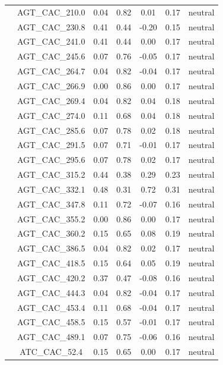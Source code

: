 \documentclass[11pt,]{article}
\begin{document}
\begin{longtable}[c]{@{}lcccccc@{}}
& AGT\_CAC\_210.0 & 0.04 & 0.82 & 0.01 & 0.17 & neutral
\\\addlinespace
& AGT\_CAC\_230.8 & 0.41 & 0.44 & -0.20 & 0.15 & neutral
\\\addlinespace
& AGT\_CAC\_241.0 & 0.41 & 0.44 & 0.00 & 0.17 & neutral
\\\addlinespace
& AGT\_CAC\_245.6 & 0.07 & 0.76 & -0.05 & 0.17 & neutral
\\\addlinespace
& AGT\_CAC\_264.7 & 0.04 & 0.82 & -0.04 & 0.17 & neutral
\\\addlinespace
& AGT\_CAC\_266.9 & 0.00 & 0.86 & 0.00 & 0.17 & neutral
\\\addlinespace
& AGT\_CAC\_269.4 & 0.04 & 0.82 & 0.04 & 0.18 & neutral
\\\addlinespace
& AGT\_CAC\_274.0 & 0.11 & 0.68 & 0.04 & 0.18 & neutral
\\\addlinespace
& AGT\_CAC\_285.6 & 0.07 & 0.78 & 0.02 & 0.18 & neutral
\\\addlinespace
& AGT\_CAC\_291.5 & 0.07 & 0.71 & -0.01 & 0.17 & neutral
\\\addlinespace
& AGT\_CAC\_295.6 & 0.07 & 0.78 & 0.02 & 0.17 & neutral
\\\addlinespace
& AGT\_CAC\_315.2 & 0.44 & 0.38 & 0.29 & 0.23 & neutral
\\\addlinespace
& AGT\_CAC\_332.1 & 0.48 & 0.31 & 0.72 & 0.31 & neutral
\\\addlinespace
& AGT\_CAC\_347.8 & 0.11 & 0.72 & -0.07 & 0.16 & neutral
\\\addlinespace
& AGT\_CAC\_355.2 & 0.00 & 0.86 & 0.00 & 0.17 & neutral
\\\addlinespace
& AGT\_CAC\_360.2 & 0.15 & 0.65 & 0.08 & 0.19 & neutral
\\\addlinespace
& AGT\_CAC\_386.5 & 0.04 & 0.82 & 0.02 & 0.17 & neutral
\\\addlinespace
& AGT\_CAC\_418.5 & 0.15 & 0.64 & 0.05 & 0.19 & neutral
\\\addlinespace
& AGT\_CAC\_420.2 & 0.37 & 0.47 & -0.08 & 0.16 & neutral
\\\addlinespace
& AGT\_CAC\_444.3 & 0.04 & 0.82 & -0.04 & 0.17 & neutral
\\\addlinespace
& AGT\_CAC\_453.4 & 0.11 & 0.68 & -0.04 & 0.17 & neutral
\\\addlinespace
& AGT\_CAC\_458.5 & 0.15 & 0.57 & -0.01 & 0.17 & neutral
\\\addlinespace
& AGT\_CAC\_489.1 & 0.07 & 0.75 & -0.06 & 0.16 & neutral
\\\addlinespace
& ATC\_CAC\_52.4 & 0.15 & 0.65 & 0.00 & 0.17 & neutral

\end{longtable}
\end{document}
